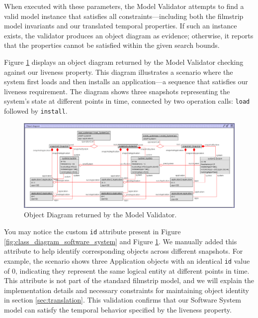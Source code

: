 When executed with these parameters, the Model Validator attempts to find a valid 
model instance that satisfies all constraints—including both the filmstrip model 
invariants and our translated temporal properties. If such an instance exists, the 
validator produces an object diagram as evidence; otherwise, it reports that the 
properties cannot be satisfied within the given search bounds.

Figure \ref{fig:object_diagram_liveness} displays an object diagram returned by the 
Model Validator checking against our liveness property. This diagram illustrates a scenario where 
the system first loads and then installs an application—a sequence that satisfies our 
liveness requirement. The diagram shows three snapshots representing the system's 
state at different points in time, connected by two operation calls: \texttt{load} 
followed by \texttt{install}.

\begin{figure}
    \centering
    \includegraphics[width=1\textwidth]{figures/c2/ObjectDiagram_Liveness_LoadInstall.png}
    \caption{Object Diagram returned by the Model Validator.}
    \label{fig:object_diagram_liveness}
\end{figure}

You may notice the custom \texttt{id} attribute present in Figure \ref{fig:class_diagram_software_system}
and Figure \ref{fig:object_diagram_liveness}. We manually added this attribute to help 
identify corresponding objects across different snapshots. For example, the scenario 
shows three Application objects with an identical \texttt{id} value of 0, indicating 
they represent the same logical entity at different points in time. This attribute 
is not part of the standard filmstrip model, and we will explain the implementation 
details and necessary constraints for maintaining object identity in section \ref{sec:translation}. 
This validation confirms that our Software System model can satisfy the temporal 
behavior specified by the liveness property.
    